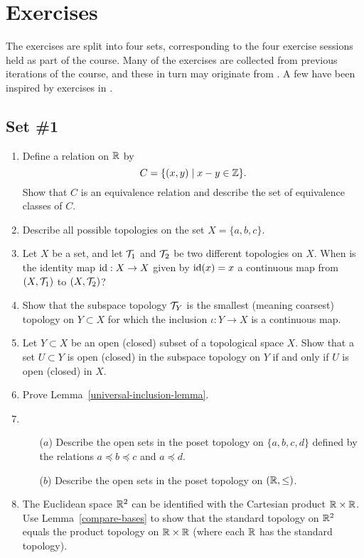 \section{Exercises}
The exercises are split into four sets, corresponding to the four exercise sessions held as part of the course. Many of the exercises are collected from previous iterations of the course, and these in turn may originate from \cite{Mun}. A few have been inspired by exercises in \cite{DM}.

\subsection{Set \#1}
\begin{enumerate}[label=1.\arabic*]
  \item Define a relation on $\mathbb{R}$ by
    \[
      C=\{(x,y) \mid x - y \in \mathbb{Z} \}.
    \]
    Show that $C$ is an equivalence relation and describe the set of equivalence classes of $C$.
  \item Describe all possible topologies on the set $X = \{a,b,c\}$.
  \item Let $X$ be a set, and let $\mathcal{T}_1$ and $\mathcal{T}_2$ be two different topologies on $X$. When is the identity map $\mathrm{id} : X \to X$ given by $\mathrm{id}(x) = x$ a continuous map from $(X,\mathcal{T}_1)$ to $(X,\mathcal{T}_2)$?
  \item
		Show that the subspace topology $\mathcal{T}_Y$ is the smallest (meaning coarsest) topology on $Y\subset X$ for which the inclusion $\iota:Y \rightarrow X$ is a continuous map.
	
	\item \label{opens-in-opens} Let $Y\subset X$ be an open (closed) subset of a topological space $X$. Show that a set $U \subset Y$ is open (closed) in the subspace topology on $Y$ if and only if $U$ is open (closed) in $X$.
	
	\item \label{universal-inclusion} Prove Lemma~\ref{universal-inclusion-lemma}.
	
  \item \begin{itemize}
		\item[($a$)] Describe the open sets in the poset topology on $\{a,b,c,d\}$ defined by the relations $a\preceq b\preceq c$ and $a\preceq d$.
		\item[($b$)] Describe the open sets in the poset topology on $(\mathbb{R},\leq)$.
	\end{itemize}
	
  \item \label{product-topology-is-standard} The Euclidean space $\mathbb{R}^2$ can be identified with the Cartesian product $\mathbb{R} \times \mathbb{R}$. Use Lemma~\ref{compare-bases} to show that the standard topology on $\mathbb{R}^2$ equals the product topology on $\mathbb{R} \times \mathbb{R}$ (where each $\mathbb{R}$ has the standard topology).
  


\end{enumerate}

